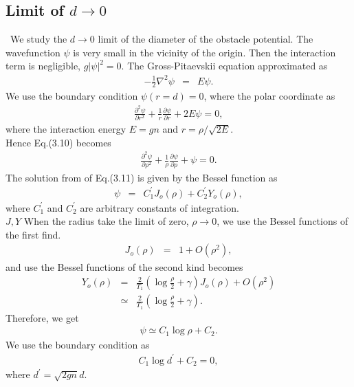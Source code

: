 \documentclass[12pt,a4paper]{report} %
\begin{document}
\subsection{Limit of $d \rightarrow 0$}
\ We study the $d \rightarrow 0$ limit of the diameter of the obstacle potential.
The wavefunction $\psi$ is very small in the vicinity of the origin.
Then the interaction term is negligible, $g|\psi|^2 = 0$. The Gross-Pitaevskii equation approximated as
\begin{eqnarray}
-\frac{1}{2} \nabla^2 \psi & = & E \psi.
\end{eqnarray}
We use the boundary condition $\psi(r=d)=0$, where the polar coordinate as
\begin{eqnarray}
\frac{\partial^2 \psi}{\partial r^2} + \frac{1}{r}\frac{\partial \psi}{\partial r} + 2E \psi = 0,
\end{eqnarray}
where the interaction energy $E = gn$ and $r = \rho/\sqrt{2E}$.
\\
Hence Eq.(3.10) becomes
\begin{eqnarray}
\frac{\partial^2 \psi}{\partial \rho^2} + \frac{1}{\rho} \frac{\partial \psi}{\partial \rho} + \psi = 0.
\end{eqnarray}
The solution from of Eq.(3.11) is given by the Bessel function as
\begin{eqnarray}
\psi & = & C_1^\prime J_o (\rho) + C_2^\prime Y_o (\rho),
\end{eqnarray}
where $C_1^\prime$ and $C_2^\prime$ are arbitrary constants of integration.
\\
$J, Y$
When the radius take the limit of zero, $\rho \rightarrow 0$,
we use the Bessel functions of the first find.
\begin{eqnarray}
J_o (\rho) & = & 1 + O(\rho^2),
\end{eqnarray}
and use the Bessel functions of the second kind becomes
\begin{eqnarray}
Y_o (\rho) & = & \frac{2}{T_1} \left( \log \frac{\rho}{2} + \gamma \right) J_o (\rho) + O(\rho^2)
\\
& \simeq & \frac{2}{T_1} \left( \log \frac{\rho}{2} + \gamma \right).
\end{eqnarray}
Therefore, we get
\begin{eqnarray}
\psi \simeq C_1 \log \rho + C_2.
\end{eqnarray}
We use the boundary condition as
\begin{eqnarray}
C_1 \log d^\prime + C_2 = 0,
\end{eqnarray}
where $d^\prime = \sqrt{2gn} d$.
\end{document}
